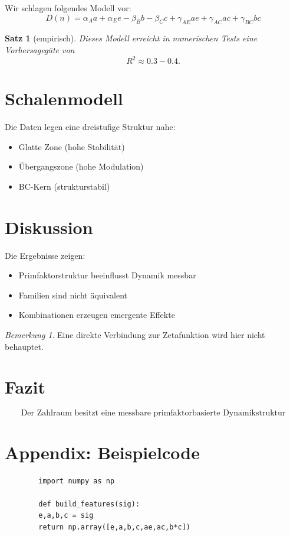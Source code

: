 \documentclass[11pt]{article}
\newtheorem{satz}{Satz}
\theoremstyle{definition}
\theoremstyle{remark}
\newtheorem{bemerkung}{Bemerkung}
\begin{document}
	Wir schlagen folgendes Modell vor:
	\[
	D(n) =
	\alpha_A a + \alpha_E e - \beta_B b - \beta_C c
	+ \gamma_{AE} ae + \gamma_{AC} ac + \gamma_{BC} bc
	\]
	
	\begin{satz}[empirisch]
		Dieses Modell erreicht in numerischen Tests eine Vorhersagegüte von
		\[
		R^2 \approx 0.3 - 0.4.
		\]
	\end{satz}
	
	\section{Schalenmodell}
	
	Die Daten legen eine dreistufige Struktur nahe:
	
	\begin{itemize}
		\item Glatte Zone (hohe Stabilität)
		\item Übergangszone (hohe Modulation)
		\item BC-Kern (strukturstabil)
	\end{itemize}
	
	\section{Diskussion}
	
	Die Ergebnisse zeigen:
	
	\begin{itemize}
		\item Primfaktorstruktur beeinflusst Dynamik messbar
		\item Familien sind nicht äquivalent
		\item Kombinationen erzeugen emergente Effekte
	\end{itemize}
	
	\begin{bemerkung}
		Eine direkte Verbindung zur Zetafunktion wird hier nicht behauptet.
	\end{bemerkung}
	
	\section{Fazit}
	
	\[
	\boxed{
		\text{Der Zahlraum besitzt eine messbare primfaktorbasierte Dynamikstruktur}
	}
	\]
	
	\appendix
	
	\section{Appendix: Beispielcode}
	
	\begin{verbatim}
		import numpy as np
		
		def build_features(sig):
		e,a,b,c = sig
		return np.array([e,a,b,c,ae,ac,b*c])
	\end{verbatim}
	
\end{document}

